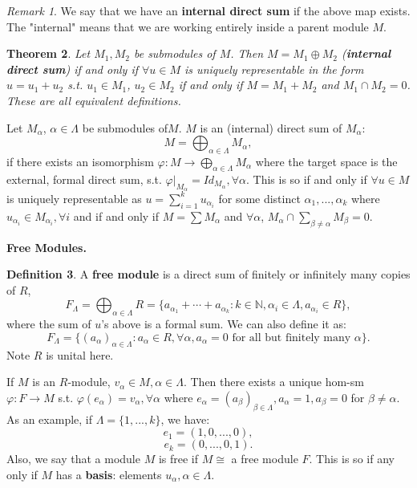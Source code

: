 \documentclass[9pt,reqno,twoside]{amsbook}
\theoremstyle{plain}
\newtheorem{theorem}{Theorem}[chapter]
\numberwithin{section}{chapter}
\numberwithin{equation}{chapter}
\theoremstyle{definition}
\newtheorem{Def}[theorem]{Definition}
\theoremstyle{remark}
\newtheorem{rem}[theorem]{Remark}
\theoremstyle{plain}
\newcommand{\n}{\mathbb{N}}
\renewcommand{\phi}{\varphi}
\begin{document}
\begin{rem}
We say that we have an \textbf{internal direct sum} if the above map exists. The "internal" means that we are working entirely inside a parent module $M$. 
\end{rem}

\begin{theorem} \label{thm10.67}
Let $M_1,M_2$ be submodules of $M$. Then $M = M_1 \oplus M_2$ (\textbf{internal direct sum}) if and only if $\forall u \in M$ is uniquely representable in the form $u = u_1 + u_2$ s.t. $u_1 \in M_1$, $u_2 \in M_2$ if and only if $M = M_1 + M_2$ and $M_1 \cap M_2 = 0$. These are all equivalent definitions. 
\end{theorem}
Let $M_\alpha$, $\alpha \in \Lambda$ be submodules of$M$. $M$ is an (internal) direct sum of $M_\alpha$:
$$
M = \bigoplus_{\alpha \in \Lambda}M_\alpha,
$$
if there exists an isomorphism $\phi: M \to \bigoplus_{\alpha \in \Lambda}M_\alpha$ where the target space is the external, formal direct sum, s.t. $\phi|_{M_\alpha} = Id_{M_\alpha}, \forall \alpha$. This is so if and only if $\forall u \in M$ is uniquely representable as $u = \sum_{i = 1}^k u_{\alpha_i}$ for some distinct $\alpha_1,...,\alpha_k$ where $u_{\alpha_i} \in M_{\alpha_i},\forall i$ and if and only if $M = \sum M_\alpha$ and $\forall \alpha$, $M_\alpha \cap \sum_{\beta \neq \alpha}M_\beta = 0$. 

\textbf{Free Modules. }
\begin{Def}
A \textbf{free module} is a direct sum of finitely or infinitely many copies of $R$, 
$$
F_\Lambda = \bigoplus_{\alpha \in \Lambda}R = \{a_{\alpha_1} + \cdots + a_{\alpha_k}: k \in \n,\alpha_i \in \Lambda,a_{\alpha_i} \in R\},
$$
where the sum of $u$'s above is a formal sum. We can also define it as: 
$$
F_\Lambda = \{(a_\alpha)_{\alpha \in \Lambda}: a_\alpha \in R,\forall \alpha,a_\alpha = 0 \text{ for all but finitely many }\alpha\}.
$$
Note $R$ is unital here. 
\end{Def}
If $M$ is an $R$-module, $v_\alpha \in M,\alpha \in \Lambda$. Then there exists a unique hom-sm $\phi: F \to M$ s.t. $\phi(e_\alpha) = v_\alpha,\forall \alpha$ where $e_\alpha = (a_\beta)_{\beta \in \Lambda},a_\alpha = 1,a_\beta = 0$ for $\beta \neq \alpha$. As an example, if $\Lambda = \{1,...,k\}$, we have: 
$$
e_1 = (1,0,...,0),
$$
$$
e_k = (0,...,0,1). 
$$
Also, we say that a module $M$ is free if $M \cong$ a free module $F$. This is so if any only if $M$ has a \textbf{basis}: elements $u_\alpha,\alpha \in \Lambda$.  
 
\end{document}
